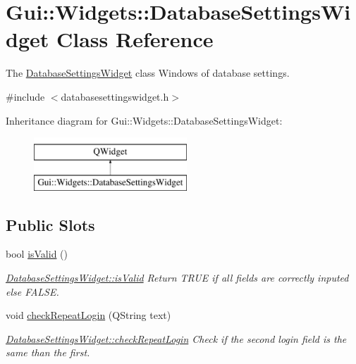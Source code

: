 \hypertarget{classGui_1_1Widgets_1_1DatabaseSettingsWidget}{\section{Gui\-:\-:Widgets\-:\-:Database\-Settings\-Widget Class Reference}
\label{classGui_1_1Widgets_1_1DatabaseSettingsWidget}
}


The \hyperlink{classGui_1_1Widgets_1_1DatabaseSettingsWidget}{Database\-Settings\-Widget} class Windows of database settings.  




{\ttfamily \#include $<$databasesettingswidget.\-h$>$}

Inheritance diagram for Gui\-:\-:Widgets\-:\-:Database\-Settings\-Widget\-:\begin{figure}[H]
\begin{center}
\leavevmode
\includegraphics[height=2.000000cm]{de/d51/classGui_1_1Widgets_1_1DatabaseSettingsWidget}
\end{center}
\end{figure}
\subsection*{Public Slots}
\begin{DoxyCompactItemize}
\item 
bool \hyperlink{classGui_1_1Widgets_1_1DatabaseSettingsWidget_a8b7f1184a885ca63edce7957b74751c6}{is\-Valid} ()
\begin{DoxyCompactList}\small\item\em \hyperlink{classGui_1_1Widgets_1_1DatabaseSettingsWidget_a8b7f1184a885ca63edce7957b74751c6}{Database\-Settings\-Widget\-::is\-Valid} Return T\-R\-U\-E if all fields are correctly inputed else F\-A\-L\-S\-E. \end{DoxyCompactList}\item 
\hypertarget{classGui_1_1Widgets_1_1DatabaseSettingsWidget_a42909f8a25f7e75685f1b02d811fd6eb}{void \hyperlink{classGui_1_1Widgets_1_1DatabaseSettingsWidget_a42909f8a25f7e75685f1b02d811fd6eb}{check\-Repeat\-Login} (Q\-String text)}\label{classGui_1_1Widgets_1_1DatabaseSettingsWidget_a42909f8a25f7e75685f1b02d811fd6eb}

\begin{DoxyCompactList}\small\item\em \hyperlink{classGui_1_1Widgets_1_1DatabaseSettingsWidget_a42909f8a25f7e75685f1b02d811fd6eb}{Database\-Settings\-Widget\-::check\-Repeat\-Login} Check if the second login field is the same than the first. \end{DoxyCompactList}\end{DoxyCompactItemize}
